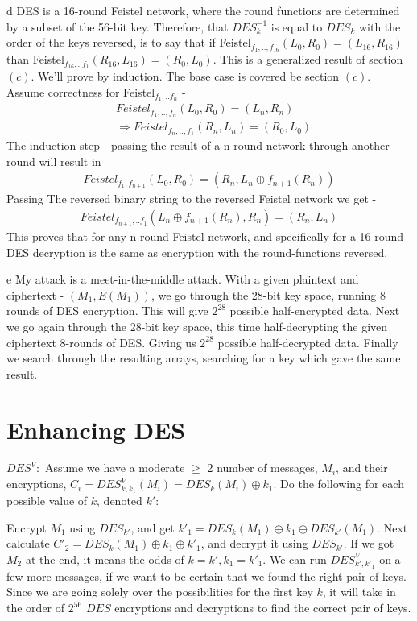 \documentclass{article}
\begin{document}
\begin{paragraph}
	d DES is a 16-round Feistel network, where the round functions are determined
	by a subset of the 56-bit key. Therefore, that $DES_k^{-1}$ is equal to
	$DES_k$ with the order of the keys reversed, is to say that if Feistel$_{f_1,..,f_{16}}(L_0, R_0) = (L_{16},R_{16})$ than 
	Feistel$_{f_{16},..f_1}(R_{16},L_{16}) = (R_0, L_0)$. This is a generalized result of
	section $(c)$. We'll prove by induction. The base case is covered be section
	$(c)$. Assume correctness for Feistel$_{f_1,..f_n}$ - 
	\begin{align*}
		&Feistel_{f_1,..,f_n}(L_0,R_0) = (L_n,R_n) \\
		&\Rightarrow Feistel_{f_n,..,f_1}(R_n,L_n) = (R_0, L_0)
	\end{align*}
	The induction step - passing the result of a n-round network through another round
	will result in
	\begin{align*}
		Feistel_{f_1,f_{n+1}}(L_0,R_0) = (R_n, L_n\oplus f_{n+1}(R_n))
	\end{align*}
	Passing The reversed binary string to the reversed Feistel network we get - 
	\begin{align*}
		Feistel_{f_{n+1},..f_1}(L_n\oplus f_{n+1}(R_n),R_n) = (R_n,L_n)
	\end{align*}
	This proves that for any n-round Feistel network, and specifically for a 16-round DES
	decryption is the same as encryption with the round-functions reversed.
\end{paragraph}

\begin{paragraph}
	e My attack is a meet-in-the-middle attack. With a given plaintext and ciphertext -
	$(M_1, E(M_1))$, we go through the 28-bit key space, running 8 rounds of
	DES encryption. This will give $2^{28}$ possible half-encrypted data. Next we go again
	through the 28-bit key space, this time half-decrypting the given ciphertext 8-rounds
	of DES. Giving us $2^{28}$ possible half-decrypted data. Finally we search through the 
	resulting arrays, searching for a key which gave the same result.
\end{paragraph}

\section{Enhancing DES}
\begin{paragraph}
	{$DES^V:$} Assume we have a moderate $\geq$ 2 number of messages, $M_i$, and their encryptions, $C_i = DES^V_{k, k_1}(M_i) = DES_k(M_i) \oplus k_1$. Do the following for each possible value of $k$, denoted $k'$:
	
	Encrypt $M_1$ using $DES_{k'}$, and get $k'_1 = DES_k(M_1) \oplus k_1 \oplus DES_{k'}(M_1)$. Next calculate $C'_2 = DES_k(M_1) \oplus k_1 \oplus k'_1$, and decrypt it using $DES_{k'}$. If we got $M_2$ at the end, it means the odds of 
	$k = k', k_1 = k'_1$. We can run $DES^V_{k', k'_1}$ on a few more messages, if we want to be certain that we found the right pair of keys. Since we are going solely over the possibilities for the first key $k$, it will take in the order of $2^{56}$ $DES$ encryptions and decryptions to find the correct pair of keys.
\end{paragraph}
\end{document}
